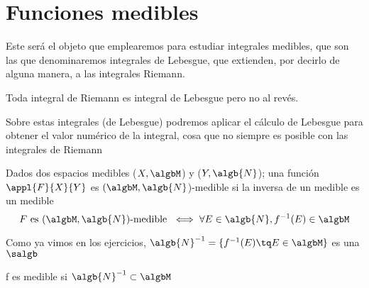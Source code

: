 \documentclass{apuntes}
\begin{document}
\chapter{Funciones medibles}
Este será el objeto que emplearemos para estudiar integrales medibles, que son las que denominaremos integrales de Lebesgue, que extienden, por decirlo de alguna manera, a las integrales Riemann.

Toda integral de Riemann es integral de Lebesgue pero no al revés.

Sobre estas integrales (de Lebesgue) podremos aplicar el cálculo de Lebesgue para obtener el valor numérico de la integral, cosa que no siempre es posible con las integrales de Riemann

\begin{defn}
Dados dos espacios medibles ($X, \algbM$) y ($Y, \algb{N}$); una función $\appl{F}{X}{Y}$ es $(\algbM,\algb{N}$)-medible si la inversa de un medible es un medible
\[F \text{ es }  (\algbM,\algb{N})\text{-medible } \iff \forall E \in \algb{N}, f^{-1}(E)\in \algbM\]
\end{defn}

Como ya vimos en los ejercicios, $\algb{N}^{-1}=\{f^{-1}(E) \tq E \in \algbM\}$ es una $\salgb$

\obs f es medible si $\algb{N}^{-1} \subset \algbM$
\end{document}

